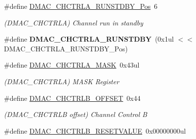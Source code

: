 \begin{DoxyCompactItemize}
\item 
\hypertarget{group___s_a_m_l21___d_m_a_c_ga9ccecc9fba410f854805ba56ce2babec}{}\#define \hyperlink{group___s_a_m_l21___d_m_a_c_ga9ccecc9fba410f854805ba56ce2babec}{D\+M\+A\+C\+\_\+\+C\+H\+C\+T\+R\+L\+A\+\_\+\+R\+U\+N\+S\+T\+D\+B\+Y\+\_\+\+Pos}~6\label{group___s_a_m_l21___d_m_a_c_ga9ccecc9fba410f854805ba56ce2babec}

\begin{DoxyCompactList}\small\item\em (D\+M\+A\+C\+\_\+\+C\+H\+C\+T\+R\+L\+A) Channel run in standby \end{DoxyCompactList}\item 
\hypertarget{group___s_a_m_l21___d_m_a_c_ga2d3c2f0bb1e2b303cfd592d7c6284807}{}\#define {\bfseries D\+M\+A\+C\+\_\+\+C\+H\+C\+T\+R\+L\+A\+\_\+\+R\+U\+N\+S\+T\+D\+B\+Y}~(0x1ul $<$$<$ D\+M\+A\+C\+\_\+\+C\+H\+C\+T\+R\+L\+A\+\_\+\+R\+U\+N\+S\+T\+D\+B\+Y\+\_\+\+Pos)\label{group___s_a_m_l21___d_m_a_c_ga2d3c2f0bb1e2b303cfd592d7c6284807}

\item 
\hypertarget{group___s_a_m_l21___d_m_a_c_ga51c70ebbb65a92c54c4cf17fdc5bfe4c}{}\#define \hyperlink{group___s_a_m_l21___d_m_a_c_ga51c70ebbb65a92c54c4cf17fdc5bfe4c}{D\+M\+A\+C\+\_\+\+C\+H\+C\+T\+R\+L\+A\+\_\+\+M\+A\+S\+K}~0x43ul\label{group___s_a_m_l21___d_m_a_c_ga51c70ebbb65a92c54c4cf17fdc5bfe4c}

\begin{DoxyCompactList}\small\item\em (D\+M\+A\+C\+\_\+\+C\+H\+C\+T\+R\+L\+A) M\+A\+S\+K Register \end{DoxyCompactList}\item 
\hypertarget{group___s_a_m_l21___d_m_a_c_ga2e5586eda8c80583dfeab044201ecc14}{}\#define \hyperlink{group___s_a_m_l21___d_m_a_c_ga2e5586eda8c80583dfeab044201ecc14}{D\+M\+A\+C\+\_\+\+C\+H\+C\+T\+R\+L\+B\+\_\+\+O\+F\+F\+S\+E\+T}~0x44\label{group___s_a_m_l21___d_m_a_c_ga2e5586eda8c80583dfeab044201ecc14}

\begin{DoxyCompactList}\small\item\em (D\+M\+A\+C\+\_\+\+C\+H\+C\+T\+R\+L\+B offset) Channel Control B \end{DoxyCompactList}\item 
\hypertarget{group___s_a_m_l21___d_m_a_c_gaf06e5882e27840def52cff8c15867a60}{}\#define \hyperlink{group___s_a_m_l21___d_m_a_c_gaf06e5882e27840def52cff8c15867a60}{D\+M\+A\+C\+\_\+\+C\+H\+C\+T\+R\+L\+B\+\_\+\+R\+E\+S\+E\+T\+V\+A\+L\+U\+E}~0x00000000ul\label{group___s_a_m_l21___d_m_a_c_gaf06e5882e27840def52cff8c15867a60}


\end{DoxyCompactItemize}
